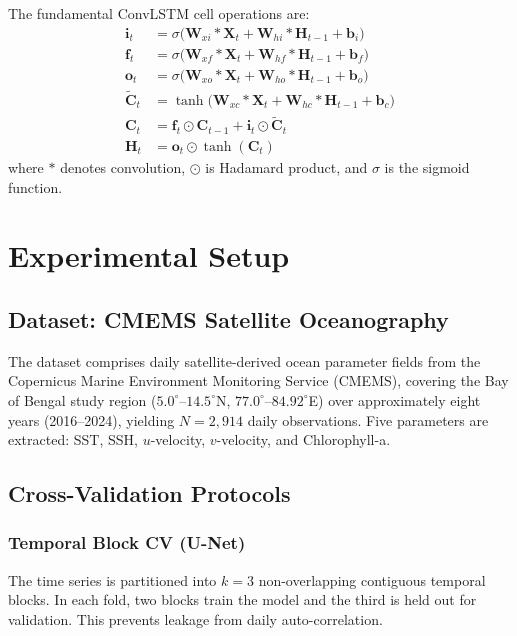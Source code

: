 \documentclass[conference]{IEEEtran}
\begin{document}
The fundamental ConvLSTM cell operations are:
\begin{align}
\mathbf{i}_t &= \sigma\bigl(\mathbf{W}_{xi} * \mathbf{X}_t +
  \mathbf{W}_{hi} * \mathbf{H}_{t-1} + \mathbf{b}_i\bigr)
  \label{eq:input_gate}\\
\mathbf{f}_t &= \sigma\bigl(\mathbf{W}_{xf} * \mathbf{X}_t +
  \mathbf{W}_{hf} * \mathbf{H}_{t-1} + \mathbf{b}_f\bigr)
  \label{eq:forget_gate}\\
\mathbf{o}_t &= \sigma\bigl(\mathbf{W}_{xo} * \mathbf{X}_t +
  \mathbf{W}_{ho} * \mathbf{H}_{t-1} + \mathbf{b}_o\bigr)
  \label{eq:output_gate}\\
\tilde{\mathbf{C}}_t &= \tanh\bigl(\mathbf{W}_{xc} * \mathbf{X}_t +
  \mathbf{W}_{hc} * \mathbf{H}_{t-1} + \mathbf{b}_c\bigr)
  \label{eq:candidate}\\
\mathbf{C}_t &= \mathbf{f}_t \odot \mathbf{C}_{t-1} +
  \mathbf{i}_t \odot \tilde{\mathbf{C}}_t
  \label{eq:cell}\\
\mathbf{H}_t &= \mathbf{o}_t \odot \tanh(\mathbf{C}_t)
  \label{eq:hidden}
\end{align}
where $*$ denotes convolution, $\odot$ is Hadamard product, and
$\sigma$ is the sigmoid function.

\section{Experimental Setup}

\subsection{Dataset: CMEMS Satellite Oceanography}
The dataset comprises daily satellite-derived ocean parameter fields
from the Copernicus Marine Environment Monitoring Service (CMEMS),
covering the Bay of Bengal study region ($5.0^\circ$--$14.5^\circ$N,
$77.0^\circ$--$84.92^\circ$E) over approximately eight years
(2016--2024), yielding $N = 2{,}914$ daily observations. Five
parameters are extracted: SST, SSH, $u$-velocity, $v$-velocity, and
Chlorophyll-a.

\subsection{Cross-Validation Protocols}

\subsubsection{Temporal Block CV (U-Net)}
The time series is partitioned into $k = 3$ non-overlapping contiguous
temporal blocks. In each fold, two blocks train the model and the
third is held out for validation. This prevents leakage from daily
auto-correlation.
\end{document}
